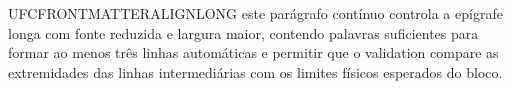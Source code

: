 UFCFRONTMATTERALIGNLONG este parágrafo contínuo controla a epígrafe longa com fonte reduzida e largura maior, contendo palavras suficientes para formar ao menos três linhas automáticas e permitir que o validation compare as extremidades das linhas intermediárias com os limites físicos esperados do bloco.
